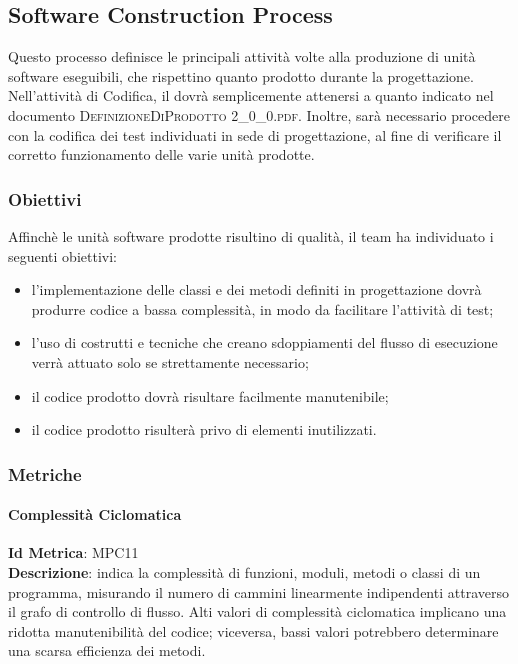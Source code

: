 			
	\subsection{Software Construction Process}
	Questo processo definisce le principali attività volte alla produzione di unità software eseguibili, che
	rispettino quanto prodotto durante la progettazione.
	Nell’attività di Codifica, il \textit{\Progr} dovrà semplicemente attenersi a quanto indicato nel documento \textsc{DefinizioneDiProdotto 2\_0\_0.pdf}. Inoltre, sarà necessario procedere con la codifica dei test individuati in sede di progettazione, al fine di verificare il corretto funzionamento delle varie unità prodotte.
		
		\subsubsection{Obiettivi}
		Affinchè le unità software prodotte risultino di qualità, il team ha individuato i seguenti obiettivi:
		\begin{itemize}
			\item l’implementazione delle classi e dei metodi definiti in progettazione dovrà produrre codice a bassa complessità, in modo da facilitare l'attività di test;
			\item l’uso di costrutti e tecniche che creano sdoppiamenti del flusso di esecuzione verrà attuato solo se strettamente necessario;
			\item il codice prodotto dovrà risultare facilmente manutenibile;
			\item il codice prodotto risulterà privo di elementi inutilizzati.
		\end{itemize}
		
		\subsubsection{Metriche}
			
			\paragraph{Complessità Ciclomatica}
			\textbf{Id Metrica}: \hypertarget{MPC11}{MPC11}\\
			\textbf{Descrizione}: indica la complessità di funzioni, moduli, metodi o classi di un programma, misurando il numero
			di cammini linearmente indipendenti attraverso il grafo di controllo di flusso. Alti valori di complessità ciclomatica implicano una ridotta manutenibilità del codice; viceversa, bassi valori potrebbero determinare una scarsa efficienza dei metodi.
			
